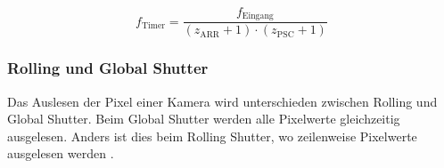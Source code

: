\begin{equation}\label{eq:f_Timer}
    f_\text{Timer} = \frac{ f_\text{Eingang} }{ \left( z_\text{ARR} + 1 \right) \cdot \left( z_\text{PSC} + 1 \right) }
\end{equation}


\subsubsection{Rolling und Global Shutter}

Das Auslesen der Pixel einer Kamera wird unterschieden zwischen Rolling und Global Shutter.
Beim Global Shutter werden alle Pixelwerte gleichzeitig ausgelesen.
Anders ist dies beim Rolling Shutter, wo zeilenweise Pixelwerte ausgelesen werden \cite{rolling-global}.






